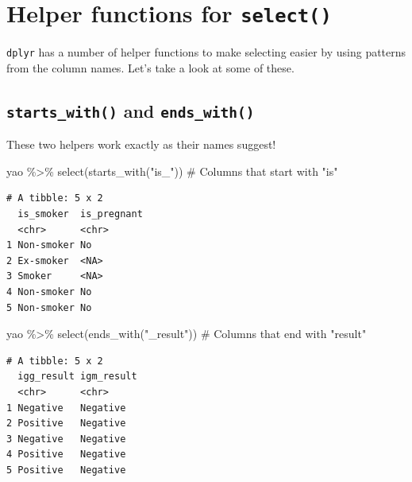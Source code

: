 \documentclass[
  letterpaper,
  DIV=11,
  numbers=noendperiod]{scrreprt}
\newenvironment{Shaded}{\begin{snugshade}}{\end{snugshade}}
\newcommand{\CommentTok}[1]{\textcolor[rgb]{0.37,0.37,0.37}{#1}}
\newcommand{\FunctionTok}[1]{\textcolor[rgb]{0.28,0.35,0.67}{#1}}
\newcommand{\NormalTok}[1]{\textcolor[rgb]{0.00,0.23,0.31}{#1}}
\newcommand{\SpecialCharTok}[1]{\textcolor[rgb]{0.37,0.37,0.37}{#1}}
\newcommand{\StringTok}[1]{\textcolor[rgb]{0.13,0.47,0.30}{#1}}
\begin{document}
\section{\texorpdfstring{Helper functions for
\texttt{select()}}{Helper functions for select()}}\label{helper-functions-for-select}

\texttt{dplyr} has a number of helper functions to make selecting easier
by using patterns from the column names. Let's take a look at some of
these.

\subsection{\texorpdfstring{\texttt{starts\_with()} and
\texttt{ends\_with()}}{starts\_with() and ends\_with()}}\label{starts_with-and-ends_with}

These two helpers work exactly as their names suggest!

\begin{Shaded}
\begin{Highlighting}[]
\NormalTok{yao }\SpecialCharTok{\%\textgreater{}\%} \FunctionTok{select}\NormalTok{(}\FunctionTok{starts\_with}\NormalTok{(}\StringTok{"is\_"}\NormalTok{)) }\CommentTok{\# Columns that start with "is"}
\end{Highlighting}
\end{Shaded}

\begin{verbatim}
# A tibble: 5 x 2
  is_smoker  is_pregnant
  <chr>      <chr>      
1 Non-smoker No         
2 Ex-smoker  <NA>       
3 Smoker     <NA>       
4 Non-smoker No         
5 Non-smoker No         
\end{verbatim}

\begin{Shaded}
\begin{Highlighting}[]
\NormalTok{yao }\SpecialCharTok{\%\textgreater{}\%} \FunctionTok{select}\NormalTok{(}\FunctionTok{ends\_with}\NormalTok{(}\StringTok{"\_result"}\NormalTok{)) }\CommentTok{\# Columns that end with "result"}
\end{Highlighting}
\end{Shaded}

\begin{verbatim}
# A tibble: 5 x 2
  igg_result igm_result
  <chr>      <chr>     
1 Negative   Negative  
2 Positive   Negative  
3 Negative   Negative  
4 Positive   Negative  
5 Positive   Negative  
\end{verbatim}
\end{document}
